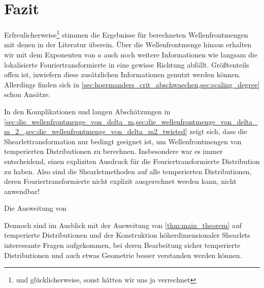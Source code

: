 \section{Fazit} %
\label{sec:fazit_für_mathematiker}


Erfreulicherweise\footnote{und glücklicherweise, sonst hätten wir uns ja verrechnet} stimmen die Ergebnisse für berechneten Wellenfrontmengen mit denen in der Literatur überein. Über die Wellenfrontmenge hinaus erhalten wir mit dem Exponenten von $a$ auch noch weitere Informationen wie langsam die lokalisierte Fouriertransformierte in eine gewisse Richtung abfällt. Größtenteils offen ist, inwiefern diese zusätzlichen Informationen genutzt werden können. Allerdings finden sich in \cref{sec:hoermanders_crit_abschwaechen,sec:scaling_degree} schon Ansätze.

In den Komplikationen und langen Abschätzungen in \cref{sec:die_wellenfrontmenge_von_delta_m,sec:die_wellenfrontmenge_von_delta_m_2_,sec:die_wellenfrontmenge_von_delta_m2_twisted} zeigt sich, dass die Shearlettransformation nur bedingt geeignet ist, um Wellenfrontmengen von temperierten Distributionen zu berechnen. Insbesondere war es immer entscheidend, einen expliziten Ausdruck für die Fouriertransformierte Distribution zu haben. Also sind die Shearletmethoden auf alle temperierten Distributionen, deren Fouriertransformierte nicht explizit ausgerechnet werden kann, nicht anwendbar!

Die Ausweitung von

Dennoch sind im Ausblick mit der Ausweitung von \cref{thm:main_theorem} auf temperierte Distributionen und  der Konstruktion höherdimensionaler Shearlets interessante Fragen aufgekommen, bei deren Bearbeitung sicher temperierte Distributionen und auch etwas Geometrie besser verstanden werden können.


